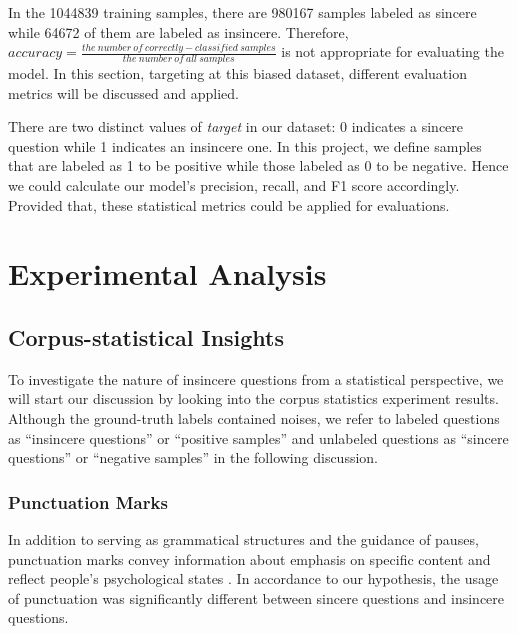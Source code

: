 \documentclass[12pt]{diazessay} %
\begin{document}
{In the \num[group-separator={,}]{1044839} training samples, there are \num[group-separator={,}]{980167} samples labeled as sincere while \num[group-separator={,}]{64672} of them are labeled as insincere. Therefore, $accuracy = \frac{ the\ number\ of\ correctly-classified\ samples}{the\ number\ of\ all\ samples}$ is not appropriate for evaluating the model. In this section, targeting at this biased dataset, different evaluation metrics will be discussed and applied.

There are two distinct values of \textit{target} in our dataset: 0 indicates a sincere question while 1 indicates an insincere one. In this project, we define samples that are labeled as 1 to be positive while those labeled as 0 to be negative. Hence we could calculate our model's precision, recall, and F1 score accordingly. Provided that, these statistical metrics could be applied for evaluations.

\section{Experimental Analysis} %
\label{sec:experimental_analysis}

\subsection{Corpus-statistical Insights} %
\label{ssub:corpus_statistical_insights}

To investigate the nature of insincere questions from a statistical perspective, we will start our discussion by looking into the corpus statistics experiment results. Although the ground-truth labels contained noises, we refer to labeled questions as ``insincere questions'' or ``positive samples'' and unlabeled questions as ``sincere questions'' or ``negative samples'' in the following discussion. 

\subsubsection{Punctuation Marks} %
\label{ssub:punctuation_marks}

In addition to serving as grammatical structures and the guidance of pauses, punctuation marks convey information about emphasis on specific content and reflect people's psychological states \citep{thorndike1948punc}. In accordance to our hypothesis, the usage of punctuation was significantly different between sincere questions and insincere questions. 

}
\end{document}
